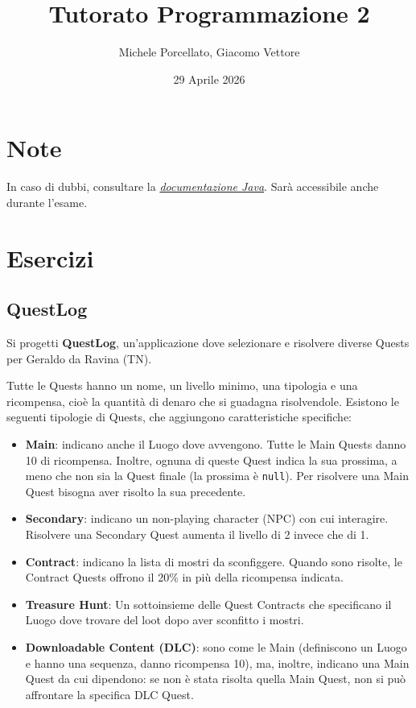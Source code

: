 \documentclass[a4paper,12pt]{article}
\title{Tutorato Programmazione 2}
\author{Michele Porcellato, Giacomo Vettore}
\date{29 Aprile 2026}
\begin{document}
\maketitle

\section{Note}
In caso di dubbi, consultare la \href{https://docs.oracle.com/en/java/javase/25/docs/api/index.html}{\textit{documentazione Java}}. Sarà accessibile anche durante l'esame.

\section{Esercizi}

\subsection{QuestLog}
Si progetti \textbf{QuestLog}, un'applicazione dove selezionare e risolvere diverse Quests per Geraldo da Ravina (TN).

Tutte le Quests hanno un nome, un livello minimo, una tipologia e una ricompensa, cioè la quantità di denaro che si guadagna risolvendole. Esistono le seguenti tipologie di Quests, che aggiungono caratteristiche specifiche:

\begin{itemize}
    \item \textbf{Main}: indicano anche il Luogo dove avvengono. Tutte le Main Quests danno 10 di ricompensa. Inoltre, ognuna di queste Quest indica la sua prossima, a meno che non sia la Quest finale (la prossima è \texttt{null}). Per risolvere una Main Quest bisogna aver risolto la sua precedente.
    \item \textbf{Secondary}: indicano un non-playing character (NPC) con cui interagire.
    Risolvere una Secondary Quest aumenta il livello di 2 invece che di 1. 
    \item \textbf{Contract}: indicano la lista di mostri da sconfiggere. Quando sono risolte, le Contract Quests offrono il 20\% in più della ricompensa indicata. 
    \item \textbf{Treasure Hunt}: Un sottoinsieme delle Quest Contracts che specificano il Luogo dove trovare del loot dopo aver sconfitto i mostri.
    \item \textbf{Downloadable Content (DLC)}: sono come le Main (definiscono un Luogo e hanno una sequenza, danno ricompensa 10), ma, inoltre, indicano una Main Quest da cui dipendono: se non è stata risolta quella Main Quest, non si può affrontare la specifica DLC Quest. 
\end{itemize}
\end{document}
